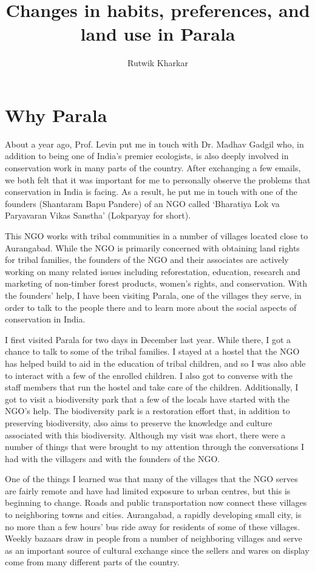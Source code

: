 \documentclass{report}
\title{Changes in habits, preferences, and land use in Parala}
\author{Rutwik Kharkar}
\begin{document}
\maketitle

\chapter*{Why Parala}\label{ch:wh_par}

About a year ago, Prof. Levin put me in touch with Dr. Madhav Gadgil who, in addition to being one of India's premier ecologists, is also deeply involved in conservation work in many parts of the country. After exchanging a few emails, we both felt that it was important for me to personally observe the problems that conservation in India is facing. As a result, he put me in touch with one of the founders (Shantaram Bapu Pandere) of an NGO called `Bharatiya Lok va Paryavaran Vikas Sanstha' (Lokparyay for short).

This NGO works with tribal communities in a number of villages located close to Aurangabad. While the NGO is primarily concerned with obtaining land rights for tribal families, the founders of the NGO and their associates are actively working on many related issues including reforestation, education, research and marketing of non-timber forest products, women's rights, and conservation. With the founders' help, I have been visiting Parala, one of the villages they serve, in order to talk to the people there and to learn more about the social aspects of conservation in India.

I first visited Parala for two days in December last year. While there, I got a chance to talk to some of the tribal families. I stayed at a hostel that the NGO has helped build to aid in the education of tribal children, and so I was also able to interact with a few of the enrolled children. I also got to converse with the staff members that run the hostel and take care of the children. Additionally, I got to visit a biodiversity park that a few of the locals have started with the NGO's help. The biodiversity park is a restoration effort that, in addition to preserving biodiversity, also aims to preserve the knowledge and culture associated with this biodiversity. Although my visit was short, there were a number of things that were brought to my attention through the conversations I had with the villagers and with the founders of the NGO.

One of the things I learned was that many of the villages that the NGO serves are fairly remote and have had limited exposure to urban centres, but this is beginning to change. Roads and public transportation now connect these villages to neighboring towns and cities. Aurangabad, a rapidly developing small city, is no more than a few hours' bus ride away for residents of some of these villages. Weekly bazaars draw in people from a number of neighboring villages and serve as an important source of cultural exchange since the sellers and wares on display come from many different parts of the country.
\end{document}

